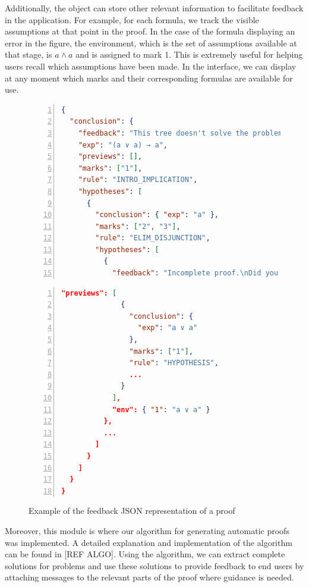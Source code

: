 Additionally, the object can store other relevant information to facilitate feedback in the application. For example, for each formula, we track the visible assumptions at that point in the proof. In the case of the formula displaying an error in the figure, the environment, which is the set of assumptions available at that stage, is \(a \land a\) and is assigned to mark 1. This is extremely useful for helping users recall which assumptions have been made. In the interface, we can display at any moment which marks and their corresponding formulas are available for use.

\begin{figure}[H]
\centering
\begin{minipage}{0.48\textwidth}
\begin{lstlisting}[language=json,
numbers=left]
{
  "conclusion": {
    "feedback": "This tree doesn't solve the problem!\nYou proved:\n{a ∨ a} ⊢ (a ∨ a) → a",
    "exp": "(a ∨ a) → a",
    "previews": [],
    "marks": ["1"],
    "rule": "INTRO_IMPLICATION",
    "hypotheses": [
      {
        "conclusion": { "exp": "a" },
        "marks": ["2", "3"],
        "rule": "ELIM_DISJUNCTION",
        "hypotheses": [
          {
            "feedback": "Incomplete proof.\nDid you forget to assign a mark?\nConsider:",
\end{lstlisting}
\end{minipage}%
\hfill
\begin{minipage}{0.48\textwidth}
\begin{lstlisting}[language=json,
numbers=left,
firstnumber=last]
            "previews": [
              {
                "conclusion": {
                  "exp": "a ∨ a"
                },
                "marks": ["1"],
                "rule": "HYPOTHESIS",
                ...
              }
            ],
            "env": { "1": "a ∨ a" }
          },
          ...
        ]
      }
    ]
  }
}
\end{lstlisting}
\end{minipage}
\caption{Example of the feedback JSON representation of a proof}
\label{lst:feed-json}
\end{figure}

Moreover, this module is where our algorithm for generating automatic proofs was implemented. A detailed explanation and implementation of the algorithm can be found in [REF ALGO]. Using the algorithm, we can extract complete solutions for problems and use these solutions to provide feedback to end users by attaching messages to the relevant parts of the proof where guidance is needed.


